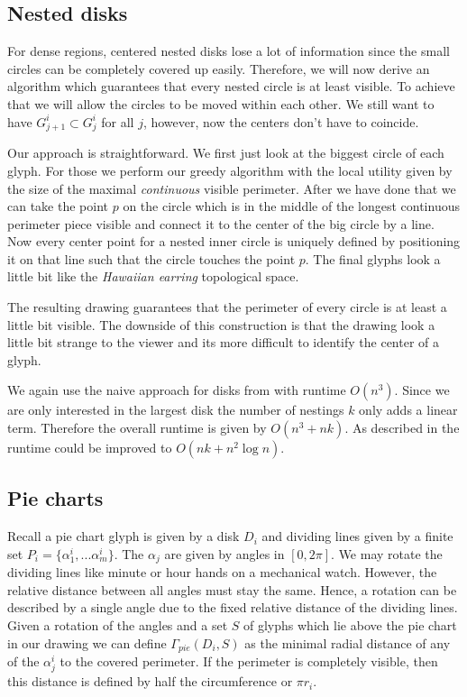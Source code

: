 \documentclass[a4paper,11pt]{article}
\begin{document}
\subsection{Nested disks}

For dense regions, centered nested disks lose a lot of information since the small circles can be completely covered up easily. Therefore, we will now derive an algorithm which guarantees that every nested circle is at least visible. To achieve that we will allow the circles to be moved within each other. We still want to have $G^i_{j+1}\subset G^i_j$ for all $j$, however, now the centers don't have to coincide.

Our approach is straightforward. We first just look at the biggest circle of each glyph. For those we perform our greedy algorithm with the local utility given by the size of the maximal \textit{continuous} visible perimeter. After we have done that we can take the point $p$ on the circle which is in the middle of the longest continuous perimeter piece visible and connect it to the center of the big circle by a line. Now every center point for a nested inner circle is uniquely defined by positioning it on that line such that the circle touches the point $p$. The final glyphs look a little bit like the \textit{Hawaiian earring} topological space.

The resulting drawing guarantees that the perimeter of every circle is at least a little bit visible. The downside of this construction is that the drawing look a little bit strange to the viewer and its more difficult to identify the center of a glyph.

We again use the naive approach for disks from \cite{cabello} with runtime $O(n^3)$. Since we are only interested in the largest disk the number of nestings $k$ only adds a linear term. Therefore the overall runtime is given by $O(n^3+nk)$. As described in \cite{cabello} the runtime could be improved to $O(nk+n^2 \log n)$.


\subsection{Pie charts}

Recall a pie chart glyph is given by a disk $D_i$ and dividing lines given by a finite set $P_i= \{\alpha_1^i,...\alpha_m^i\}$. The $\alpha_j$ are given by angles in $[0,2\pi ]$. We may rotate the dividing lines like minute or hour hands on a mechanical watch. However, the relative distance between all angles must stay the same. Hence, a rotation can be described by a single angle due to the fixed relative distance of the dividing lines. Given a rotation of the angles and a set $S$ of glyphs which lie above the pie chart in our drawing we can define $\Gamma_{pie}(D_i,S)$ as the minimal radial distance of any of the $\alpha^i_j$ to the covered perimeter. If the perimeter is completely visible, then this distance is defined by half the circumference or $\pi r_i$.
\end{document}
